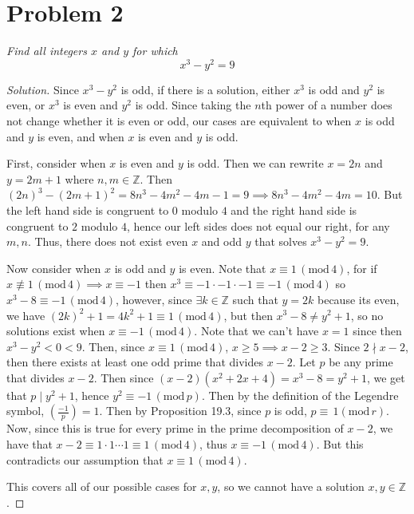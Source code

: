 \documentclass{article}
\newcommand{\Z}{{\mathbb Z}}
\begin{document}
\section*{Problem 2}
{\it Find all integers $x$ and $y$ for which
	\[
		x^3 - y^2 = 9
	\]
}
\begin{proof}[Solution]\let\qed\relax
	Since $x^3 - y^2$ is odd, if there is a solution, either $x^3$ is odd and $y^2$ is even,
	or $x^3$ is even and $y^2$ is odd.
	Since taking the $n$th power of a number does not change
	whether it is even or odd, our cases are equivalent to
	when $x$ is odd and $y$ is even, and when $x$ is even and $y$ is odd.

	First, consider when $x$ is even and $y$ is odd.
	Then we can rewrite $x = 2n$ and $y = 2m+1$ where $n,m \in \Z$.
	Then $(2n)^3 - (2m+1)^2 = 8n^3 - 4m^2 - 4m - 1 = 9 \implies 8n^3 - 4m^2 - 4m = 10$.
	But the left hand side is congruent to $0$ modulo $4$
	and the right hand side is congruent to $2$ modulo $4$,
	hence our left sides does not equal our right, for any $m,n$.
	Thus, there does not exist even $x$ and odd $y$ that solves $x^3 - y^2 = 9$.

	Now consider when $x$ is odd and $y$ is even.
	Note that $x \equiv 1\,(\mathrm{mod}\,4)$,
	for if $x \not \equiv 1\,(\mathrm{mod}\,4) \implies x \equiv -1$
	then $x^3 \equiv -1\cdot -1 \cdot -1 \equiv -1\,(\mathrm{mod}\,4)$
	so $x^3 - 8 \equiv -1\,(\mathrm{mod}\,4)$,
	however, since $\exists k \in \Z$ such that $y = 2k$ because its even,
	we have $(2k)^2 + 1 = 4k^2 + 1\equiv 1 \,(\mathrm{mod}\,4)$,
	but then $x^3 - 8 \neq y^2 + 1$,
	so no solutions exist when $x \equiv -1 \,(\mathrm{mod}\,4)$.
	Note that we can't have $x = 1$ since then $x^3 - y^2 < 0 < 9$.
	Then, since $x \equiv 1 \,(\mathrm{mod}\,4)$, $x \geq 5 \implies x-2 \geq 3$.
	Since $2 \nmid x - 2$, then there exists at least one odd prime that divides $x-2$.
	Let $p$ be any prime that divides $x-2$.
	Then since $(x-2)(x^2+2x+4) = x^3 - 8 = y^2 + 1$,
	we get that $p \mid y^2 + 1$,
	hence $y^2 \equiv -1 \,(\mathrm{mod}\,p)$.
	Then by the definition of the Legendre symbol,
	$\left(\frac{-1}{p}\right) = 1$.
	Then by Proposition 19.3, since $p$ is odd, $p \equiv \, 1(\mathrm{mod}\,r)$.
	Now, since this is true for every prime in the prime decomposition of $x-2$,
	we have that $x-2 \equiv 1\cdot 1 \cdots 1 \equiv 1 \,(\mathrm{mod}\,4)$,
	thus $x \equiv -1\, (\mathrm{mod}\, 4)$.
	But this contradicts our assumption that $x \equiv 1\,(\mathrm{mod}\,4)$.

	This covers all of our possible cases for $x,y$,
	so we cannot have a solution $x,y \in \Z$.
\end{proof}
\end{document}

